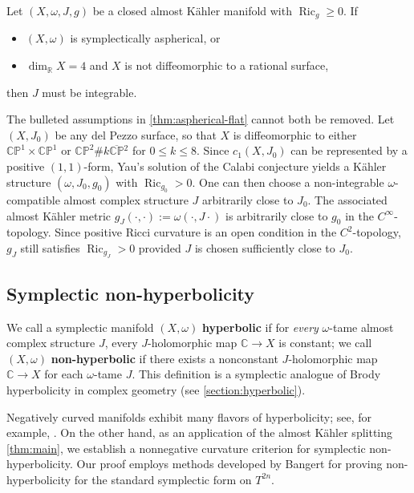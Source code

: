 \documentclass[11pt,twoside]{amsart}
\DeclareMathOperator{\Ric}{Ric}
\newcommand{\R}{\mathbb{R}}
\newcommand{\C}{\mathbb{C}}
\begin{document}
\begin{theorem}\label{thm:aspherical-flat}
Let $(X,\omega,J,g)$ be a closed almost K\"ahler manifold with
$\Ric_g\geq 0$. If 
\begin{itemize}[nosep]
    \item $(X,\omega)$ is symplectically aspherical, or
    \item $\dim_\R X=4$ and $X$ is not diffeomorphic to a rational surface,
\end{itemize}
 then $J$ must be integrable.
\end{theorem}

 \begin{remark}\label{rmk:perturb}
    The bulleted assumptions in \autoref{thm:aspherical-flat} cannot both be removed. Let $(X,J_0)$ be any del Pezzo surface, so that $X$ is diffeomorphic to either $\mathbb{CP}^1\times\mathbb{CP}^1$ or $\mathbb{CP}^2\#k\overline{\mathbb{CP}}{}^2$ for $0\leq k\leq 8$. Since $c_1(X,J_0)$ can be represented by a positive $(1,1)$-form, Yau's solution of the Calabi conjecture yields a K\"ahler structure $(\omega,J_0,g_0)$ with $\Ric_{g_0}>0$. One can then choose a non-integrable $\omega$-compatible almost complex structure $J$ arbitrarily close to $J_0$. The associated almost K\"ahler metric
    \(
        g_J(\cdot,\cdot):=\omega(\cdot,J\cdot)
    \)
    is arbitrarily close to $g_0$ in the $C^\infty$-topology. Since positive Ricci curvature is an open condition in the $C^2$-topology, $g_J$ still satisfies $\Ric_{g_J}>0$ provided $J$ is chosen sufficiently close to $J_0$. 
\end{remark}


\subsection{Symplectic non-hyperbolicity}
We call a symplectic manifold $(X,\omega)$ {\bf hyperbolic} if for \emph{every} $\omega$-tame almost complex structure $J$, every $J$-holomorphic map $\C \to X$ is constant; we call $(X,\omega)$ {\bf non-hyperbolic} if there exists a nonconstant $J$-holomorphic map $\C \to X$ for each $\omega$-tame $J$. This definition is a symplectic analogue of Brody hyperbolicity in complex geometry (see \autoref{section:hyperbolic}).


Negatively curved manifolds exhibit many flavors of hyperbolicity; see, for example, \cite{kobayashi2005hyperbolic, Royden, Gromovhyperbolic,Demailly_algebraic_1997, Zheng02, ChenYang}. 
On the other hand, as an application of the almost K\"ahler splitting \autoref{thm:main}, we establish a nonnegative curvature criterion for symplectic non-hyperbolicity. Our proof employs methods developed by Bangert \cite{Bangert1998Existence} for proving non-hyperbolicity for the standard symplectic form on $T^{2n}$. 
\end{document}
